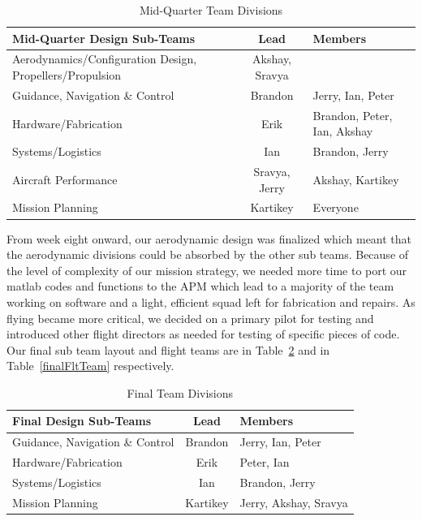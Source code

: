 \documentclass[11pt]{article}
\begin{document}
		\begin{table}[!ht]
			\begin{center}
				\begin{tabular}{| p{7.5cm} | c | p{3.7cm} |}
					\hline
					\textbf{Mid-Quarter Design Sub-Teams} & \textbf{Lead} & \textbf{Members} \\ \hline
					Aerodynamics/Configuration Design, Propellers/Propulsion & Akshay, Sravya & \\ \hline
					Guidance, Navigation \& Control & Brandon & Jerry, Ian, Peter \\ \hline
					Hardware/Fabrication & Erik & Brandon, Peter, Ian, Akshay \\ \hline
					Systems/Logistics & Ian & Brandon, Jerry \\ \hline
					Aircraft Performance & Sravya, Jerry & Akshay, Kartikey \\ \hline
					Mission Planning & Kartikey & Everyone \\ \hline
				\end{tabular}
				\caption{Mid-Quarter Team Divisions}
				\label{midTeam}
			\end{center}
		\end{table}

		From week eight onward, our aerodynamic design was finalized which meant that the aerodynamic divisions could be absorbed by the other sub teams. Because of the level of complexity of our mission strategy, we needed more time to port our matlab codes and functions to the APM which lead to a majority of the team working on software and a light, efficient squad left for fabrication and repairs. As flying became more critical, we decided on a primary pilot for testing and introduced other flight directors as needed for testing of specific pieces of code. Our final sub team layout and flight teams are in Table~\ref{finalTeam} and in Table~\ref{finalFltTeam} respectively.

		\begin{table}[!ht]
			\begin{center}
				\begin{tabular}{| p{7.5cm} | c | p{3.7cm} |}
					\hline
					\textbf{Final Design Sub-Teams} & \textbf{Lead} & \textbf{Members} \\ \hline
					Guidance, Navigation \& Control & Brandon & Jerry, Ian, Peter \\ \hline
					Hardware/Fabrication & Erik & Peter, Ian \\ \hline
					Systems/Logistics & Ian & Brandon, Jerry \\ \hline
					Mission Planning & Kartikey & Jerry, Akshay, Sravya \\ \hline
				\end{tabular}
				\caption{Final Team Divisions}
				\label{finalTeam}
			\end{center}
		\end{table}
\end{document}
